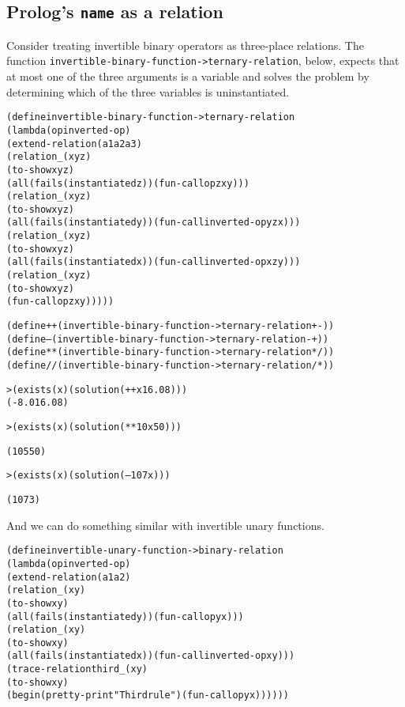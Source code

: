 \subsection{Prolog's \texttt{name} as a relation}

Consider treating invertible binary operators as three-place
relations. The function
\texttt{invertible-binary-function->ternary-relation}, below, expects
that at most one of the three arguments is a variable and solves the
problem by determining which of the three variables is uninstantiated.

\begin{alltt}
(define invertible-binary-function->ternary-relation
  (lambda (op inverted-op)
    (extend-relation (a1 a2 a3)
      (relation _ (x y z)
        (to-show x y z)
        (all (fails (instantiated z)) (fun-call op z x y)))
      (relation _ (x y z)
        (to-show x y z)
        (all (fails (instantiated y)) (fun-call inverted-op y z x)))
      (relation _ (x y z)
        (to-show x y z)
        (all (fails (instantiated x)) (fun-call inverted-op x z y)))
      (relation _ (x y z)
        (to-show x y z)
        (fun-call op z x y)))))

(define ++ (invertible-binary-function->ternary-relation + -))
(define -- (invertible-binary-function->ternary-relation - +))
(define ** (invertible-binary-function->ternary-relation * /))
(define // (invertible-binary-function->ternary-relation / *))

> (exists (x) (solution (++ x 16.0 8)))
(-8.0 16.0 8)

> (exists (x) (solution (** 10 x 50)))

(10 5 50)

> (exists (x) (solution (-- 10 7 x)))

(10 7 3)
\end{alltt}

And we can do something similar with invertible unary functions.
\begin{alltt}
(define invertible-unary-function->binary-relation
  (lambda (op inverted-op)
    (extend-relation (a1 a2)
      (relation _ (x y)
        (to-show x y)
        (all (fails (instantiated y)) (fun-call op y x)))
      (relation _ (x y)
        (to-show x y)
        (all (fails (instantiated x)) (fun-call inverted-op x y)))
      (trace-relation third _ (x y)
        (to-show x y)
        (begin (pretty-print "Third rule") (fun-call op y x))))))
\end{alltt}

